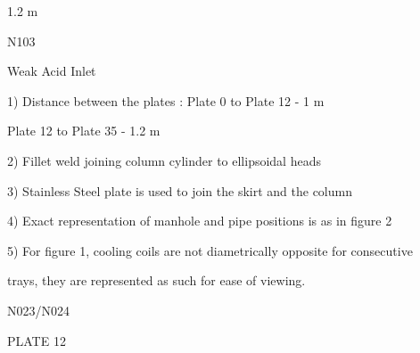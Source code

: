 \documentclass[a4paper,portrait,12pt]{article}
\begin{document}
\begin{flushleft}
1.2 m
\end{flushleft}





\begin{flushleft}
N103
\end{flushleft}


\begin{flushleft}
Weak Acid Inlet
\end{flushleft}





\begin{flushleft}
1) Distance between the plates : Plate 0 to Plate 12 - 1 m
\end{flushleft}


\begin{flushleft}
Plate 12 to Plate 35 - 1.2 m
\end{flushleft}


\begin{flushleft}
2) Fillet weld joining column cylinder to ellipsoidal heads
\end{flushleft}


\begin{flushleft}
3) Stainless Steel plate is used to join the skirt and the column
\end{flushleft}


\begin{flushleft}
4) Exact representation of manhole and pipe positions is as in figure 2
\end{flushleft}


\begin{flushleft}
5) For figure 1, cooling coils are not diametrically opposite for consecutive
\end{flushleft}


\begin{flushleft}
trays, they are represented as such for ease of viewing.
\end{flushleft}





\begin{flushleft}
N023/N024
\end{flushleft}





\begin{flushleft}
PLATE 12
\end{flushleft}
\end{document}
